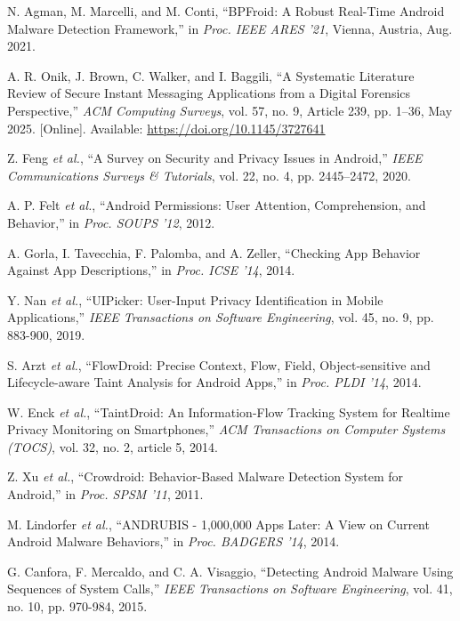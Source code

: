 \documentclass[a4paper,12pt]{report}
\begin{document}
\begin{thebibliography}{99}
N. Agman, M. Marcelli, and M. Conti, “BPFroid: A Robust Real-Time Android Malware Detection Framework,” in \emph{Proc. IEEE ARES ’21}, Vienna, Austria, Aug. 2021.

A. R. Onik, J. Brown, C. Walker, and I. Baggili, “A Systematic Literature Review of Secure Instant Messaging Applications from a Digital Forensics Perspective,” \emph{ACM Computing Surveys}, vol. 57, no. 9, Article 239, pp. 1–36, May 2025. [Online]. Available: \url{https://doi.org/10.1145/3727641}

Z. Feng \emph{et al.}, “A Survey on Security and Privacy Issues in Android,” \emph{IEEE Communications Surveys \& Tutorials}, vol. 22, no. 4, pp. 2445–2472, 2020.

A. P. Felt \emph{et al.}, “Android Permissions: User Attention, Comprehension, and Behavior,” in \emph{Proc. SOUPS '12}, 2012.

A. Gorla, I. Tavecchia, F. Palomba, and A. Zeller, “Checking App Behavior Against App Descriptions,” in \emph{Proc. ICSE '14}, 2014.

Y. Nan \emph{et al.}, “UIPicker: User-Input Privacy Identification in Mobile Applications,” \emph{IEEE Transactions on Software Engineering}, vol. 45, no. 9, pp. 883-900, 2019.

S. Arzt \emph{et al.}, “FlowDroid: Precise Context, Flow, Field, Object-sensitive and Lifecycle-aware Taint Analysis for Android Apps,” in \emph{Proc. PLDI '14}, 2014.

W. Enck \emph{et al.}, “TaintDroid: An Information-Flow Tracking System for Realtime Privacy Monitoring on Smartphones,” \emph{ACM Transactions on Computer Systems (TOCS)}, vol. 32, no. 2, article 5, 2014.

Z. Xu \emph{et al.}, “Crowdroid: Behavior-Based Malware Detection System for Android,” in \emph{Proc. SPSM '11}, 2011.

M. Lindorfer \emph{et al.}, “ANDRUBIS - 1,000,000 Apps Later: A View on Current Android Malware Behaviors,” in \emph{Proc. BADGERS '14}, 2014.

G. Canfora, F. Mercaldo, and C. A. Visaggio, “Detecting Android Malware Using Sequences of System Calls,” \emph{IEEE Transactions on Software Engineering}, vol. 41, no. 10, pp. 970-984, 2015.


\end{thebibliography}
\end{document}
